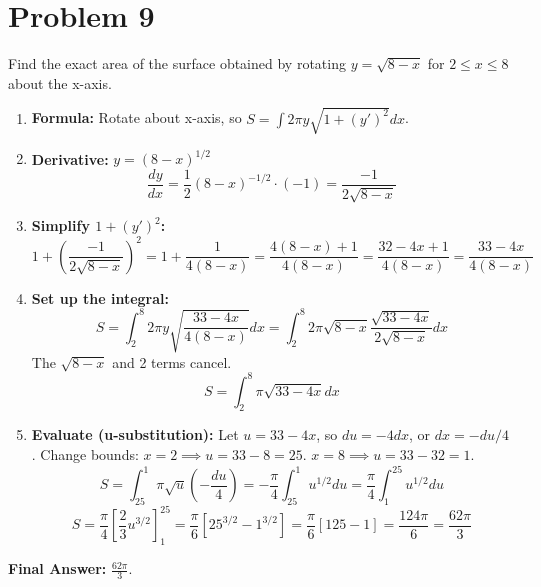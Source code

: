 \documentclass{article}
\begin{document}
\section{Problem 9}
Find the exact area of the surface obtained by rotating \(y=\sqrt{8-x}\) for \(2 \le x \le 8\) about the x-axis.
\begin{enumerate}
    \item \textbf{Formula:} Rotate about x-axis, so \(S = \int 2\pi y \sqrt{1+(y')^2} dx\).
    \item \textbf{Derivative:} \(y = (8-x)^{1/2}\)
    \[ \frac{dy}{dx} = \frac{1}{2}(8-x)^{-1/2} \cdot (-1) = \frac{-1}{2\sqrt{8-x}} \]
    \item \textbf{Simplify \(1+(y')^2\):}
    \[ 1 + \left(\frac{-1}{2\sqrt{8-x}}\right)^2 = 1 + \frac{1}{4(8-x)} = \frac{4(8-x)+1}{4(8-x)} = \frac{32-4x+1}{4(8-x)} = \frac{33-4x}{4(8-x)} \]
    \item \textbf{Set up the integral:}
    \[ S = \int_{2}^{8} 2\pi y \sqrt{\frac{33-4x}{4(8-x)}} dx = \int_{2}^{8} 2\pi \sqrt{8-x} \frac{\sqrt{33-4x}}{2\sqrt{8-x}} dx \]
    The \(\sqrt{8-x}\) and 2 terms cancel.
    \[ S = \int_{2}^{8} \pi \sqrt{33-4x} dx \]
    \item \textbf{Evaluate (u-substitution):} Let \(u=33-4x\), so \(du = -4dx\), or \(dx = -du/4\).
    Change bounds: \(x=2 \implies u=33-8=25\). \(x=8 \implies u=33-32=1\).
    \[ S = \int_{25}^{1} \pi \sqrt{u} \left(-\frac{du}{4}\right) = -\frac{\pi}{4} \int_{25}^{1} u^{1/2} du = \frac{\pi}{4} \int_{1}^{25} u^{1/2} du \]
    \[ S = \frac{\pi}{4} \left[ \frac{2}{3}u^{3/2} \right]_{1}^{25} = \frac{\pi}{6} [25^{3/2} - 1^{3/2}] = \frac{\pi}{6} [125 - 1] = \frac{124\pi}{6} = \frac{62\pi}{3} \]
\end{enumerate}
\textbf{Final Answer:} \(\frac{62\pi}{3}\).
\end{document}
